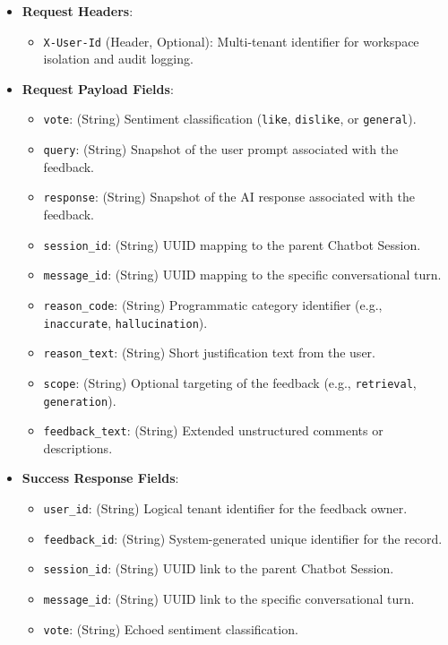 \begin{itemize}
    \item \textbf{Request Headers}:
    \begin{itemize}
        \item \texttt{X-User-Id} (Header, Optional): Multi-tenant identifier for workspace isolation and audit logging.
    \end{itemize}
    \item \textbf{Request Payload Fields}:
    \begin{itemize}
        \item \texttt{vote}: (String) Sentiment classification (\texttt{like}, \texttt{dislike}, or \texttt{general}).
        \item \texttt{query}: (String) Snapshot of the user prompt associated with the feedback.
        \item \texttt{response}: (String) Snapshot of the AI response associated with the feedback.
        \item \texttt{session\_id}: (String) UUID mapping to the parent Chatbot Session.
        \item \texttt{message\_id}: (String) UUID mapping to the specific conversational turn.
        \item \texttt{reason\_code}: (String) Programmatic category identifier (e.g., \texttt{inaccurate}, \texttt{hallucination}).
        \item \texttt{reason\_text}: (String) Short justification text from the user.
        \item \texttt{scope}: (String) Optional targeting of the feedback (e.g., \texttt{retrieval}, \texttt{generation}).
        \item \texttt{feedback\_text}: (String) Extended unstructured comments or descriptions.
    \end{itemize}
    \item \textbf{Success Response Fields}:
    \begin{itemize}
        \item \texttt{user\_id}: (String) Logical tenant identifier for the feedback owner.
        \item \texttt{feedback\_id}: (String) System-generated unique identifier for the record.
        \item \texttt{session\_id}: (String) UUID link to the parent Chatbot Session.
        \item \texttt{message\_id}: (String) UUID link to the specific conversational turn.
        \item \texttt{vote}: (String) Echoed sentiment classification.

\end{itemize}
\end{itemize}
